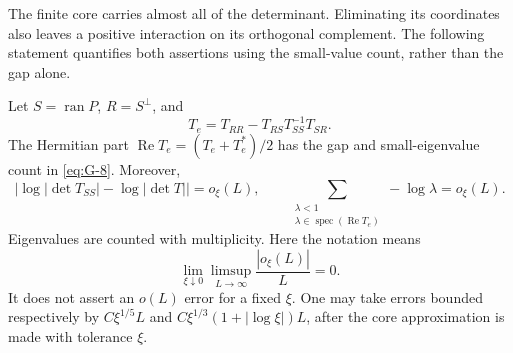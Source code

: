 The finite core carries almost all of the determinant. Eliminating
its coordinates also leaves a positive interaction on its orthogonal
complement. The following statement quantifies both assertions using
the small-value count, rather than the gap alone.

\begin{lemma}\label{lem:03-schur}\label{E:schur-comparison}
Let \(S=\operatorname{ran}P\), \(R=S^\perp\), and
\[
 T_e=T_{RR}-T_{RS}T_{SS}^{-1}T_{SR}.
\]
The Hermitian part \(\operatorname{Re}T_e=(T_e+T_e^*)/2\) has the gap
and small-eigenvalue count in \eqref{eq:G-8}. Moreover,
\begin{equation}
 \left|\log|\det T_{SS}|-\log|\det T|\right|=o_\xi(L),
 \qquad
 \sum_{\substack{\lambda<1\\
        \lambda\in\operatorname{spec}(\operatorname{Re}T_e)}}
       -\log\lambda=o_\xi(L).
 \label{eq:G-11}
\end{equation}
Eigenvalues are counted with multiplicity. Here the notation means
\[
 \lim_{\xi\downarrow0}\limsup_{L\to\infty}
       \frac{|o_\xi(L)|}{L}=0.
\]
It does not assert an \(o(L)\) error for a fixed \(\xi\). One may take errors bounded respectively by
\(C\xi^{1/5}L\) and
\(C\xi^{1/3}(1+|\log\xi|)L\), after the core approximation is made
with tolerance \(\xi\).
\end{lemma}
